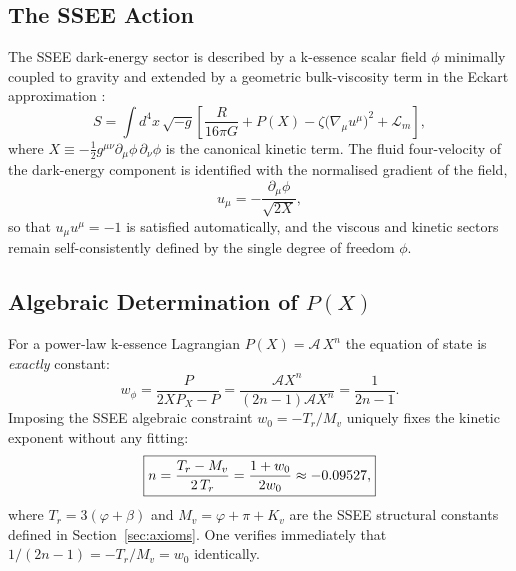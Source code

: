 \subsection{The SSEE Action}

The SSEE dark-energy sector is described by a k-essence scalar field $\phi$
minimally coupled to gravity and extended by a geometric bulk-viscosity term
in the Eckart approximation \citep{Eckart1940, Weinberg1971}:
%
\begin{equation}
  S = \int d^{4}x\,\sqrt{-g}
      \left[\frac{R}{16\pi G} + P(X) - \zeta\bigl(\nabla_{\!\mu}u^{\mu}\bigr)^{2}
            + \mathcal{L}_{m}\right],
  \label{eq:eft_action}
\end{equation}
%
where $X \equiv -\tfrac{1}{2}g^{\mu\nu}\partial_{\mu}\phi\,\partial_{\nu}\phi$
is the canonical kinetic term.  The fluid four-velocity of the dark-energy
component is identified with the normalised gradient of the field,
%
\begin{equation}
  u_{\mu} = -\frac{\partial_{\mu}\phi}{\sqrt{2X}},
  \label{eq:four_velocity}
\end{equation}
%
so that $u_{\mu}u^{\mu}=-1$ is satisfied automatically, and the viscous and
kinetic sectors remain self-consistently defined by the single degree of freedom
$\phi$.

\subsection{Algebraic Determination of \texorpdfstring{$P(X)$}{P(X)}}
\label{sec:eft:PX}

For a power-law k-essence Lagrangian
$P(X) = \mathcal{A}\,X^{n}$ the equation of state is \emph{exactly} constant:
%
\begin{equation}
  w_{\phi}
    = \frac{P}{2X P_{X} - P}
    = \frac{\mathcal{A}X^{n}}{(2n-1)\mathcal{A}X^{n}}
    = \frac{1}{2n-1}.
  \label{eq:w_kessence}
\end{equation}
%
Imposing the SSEE algebraic constraint $w_{0} = -T_{r}/M_{v}$ uniquely fixes
the kinetic exponent without any fitting:
%
\begin{equation}
  \boxed{%
    n = \frac{T_{r} - M_{v}}{2\,T_{r}}
      = \frac{1 + w_{0}}{2w_{0}}
      \approx -0.09527,}
  \label{eq:n_ssee}
\end{equation}
%
where $T_{r} = 3(\varphi+\beta)$ and $M_{v} = \varphi+\pi+K_{v}$ are the
SSEE structural constants defined in Section~\ref{sec:axioms}.
One verifies immediately that $1/(2n-1) = -T_{r}/M_{v} = w_{0}$ identically.

